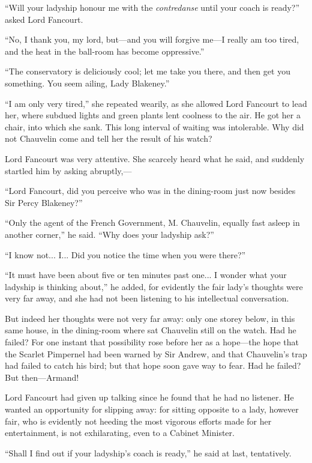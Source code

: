 \documentclass[paper=5.5in:8.5in,BCOR=7mm,twoside,DIV=calc,12pt,usegeometry,chapterprefix,endperiod,headings=big]{scrbook}
\begin{document}
\enquote{Will your ladyship honour me with the \textit{contredanse} until your coach is ready?} asked Lord Fancourt.

\enquote{No, I thank you, my lord, but---and you will forgive me---I really am too tired, and the heat in the ball-room has become oppressive.}

\enquote{The conservatory is deliciously cool; let me take you there, and then get you something. You seem ailing, Lady Blakeney.}

\enquote{I am only very tired,} she repeated wearily, as she allowed Lord Fancourt to lead her, where subdued lights and green plants lent coolness to the air. He got her a chair, into which she sank. This long interval of waiting was intolerable. Why did not Chauvelin come and tell her the result of his watch?

Lord Fancourt was very attentive. She scarcely heard what he said, and suddenly startled him by asking abruptly,---

\enquote{Lord Fancourt, did you perceive who was in the dining-room just now besides Sir Percy Blakeney?}

\enquote{Only the agent of the French Government, M. Chauvelin, equally fast asleep in another corner,} he said. \enquote{Why does your ladyship ask?}

\enquote{I know not... I... Did you notice the time when you were there?}

\enquote{It must have been about five or ten minutes past one... I wonder what your ladyship is thinking about,} he added, for evidently the fair lady's thoughts were very far away, and she had not been listening to his intellectual conversation.

But indeed her thoughts were not very far away: only one storey below, in this same house, in the dining-room where sat Chauvelin still on the watch. Had he failed? For one instant that possibility rose before her as a hope---the hope that the Scarlet Pimpernel had been warned by Sir Andrew, and that Chauvelin's trap had failed to catch his bird; but that hope soon gave way to fear. Had he failed? But then---Armand!

Lord Fancourt had given up talking since he found that he had no listener. He wanted an opportunity for slipping away: for sitting opposite to a lady, however fair, who is evidently not heeding the most vigorous efforts made for her entertainment, is not exhilarating, even to a Cabinet Minister.

\enquote{Shall I find out if your ladyship's coach is ready,} he said at last, tentatively.
\end{document}

